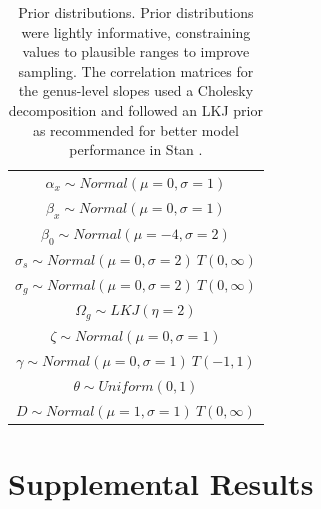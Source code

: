 \documentclass[preprint,final,times,12pt,3p]{elsarticle}
\begin{document}
\newpage

\begin{table}[ht]
	\centering
	\begin{tabular}{c}
		\hline
		$\alpha_x \sim Normal(\mu=0, \sigma=1)$ \\
		$\beta_x \sim Normal(\mu=0, \sigma=1)$ \\
		$\beta_0 \sim Normal(\mu=-4, \sigma=2)$ \\
		$\sigma_s \sim Normal(\mu=0, \sigma=2) \ T(0,\infty)$\\
		$\sigma_g \sim Normal(\mu=0, \sigma=2) \ T(0,\infty)$\\
		$\Omega_g \sim LKJ(\eta=2)$ \\
		$\zeta \sim Normal(\mu=0, \sigma=1)$\\
		$\gamma \sim Normal(\mu=0, \sigma=1) \ T(-1,1)$\\
		$\theta \sim Uniform(0,1)$ \\
		$D \sim Normal(\mu=1, \sigma=1) \ T(0,\infty)$ \\
		\hline
	\end{tabular}
	\caption{\label{table:priors} Prior distributions. Prior distributions were lightly informative, constraining values to plausible ranges to improve sampling. The correlation matrices for the genus-level slopes used a Cholesky decomposition and followed an LKJ prior as recommended for better model performance in Stan \citep{Carpenter2017,Caradima2019}.}
\end{table}



\newpage

\lstset{basicstyle=\scriptsize}






\newpage

\section{Supplemental Results}
\end{document}
